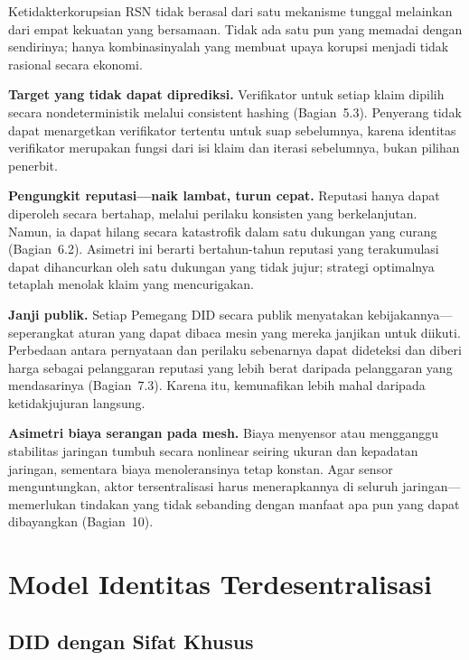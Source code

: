 \documentclass[11pt,a4paper,twocolumn]{article}
\begin{document}
Ketidakterkorupsian RSN tidak berasal dari satu mekanisme tunggal melainkan dari empat kekuatan yang bersamaan. Tidak ada satu pun yang memadai dengan sendirinya; hanya kombinasinyalah yang membuat upaya korupsi menjadi tidak rasional secara ekonomi.

\textbf{Target yang tidak dapat diprediksi.} Verifikator untuk setiap klaim dipilih secara nondeterministik melalui consistent hashing (Bagian~5.3). Penyerang tidak dapat menargetkan verifikator tertentu untuk suap sebelumnya, karena identitas verifikator merupakan fungsi dari isi klaim dan iterasi sebelumnya, bukan pilihan penerbit.

\textbf{Pengungkit reputasi---naik lambat, turun cepat.} Reputasi hanya dapat diperoleh secara bertahap, melalui perilaku konsisten yang berkelanjutan. Namun, ia dapat hilang secara katastrofik dalam satu dukungan yang curang (Bagian~6.2). Asimetri ini berarti bertahun-tahun reputasi yang terakumulasi dapat dihancurkan oleh satu dukungan yang tidak jujur; strategi optimalnya tetaplah menolak klaim yang mencurigakan.

\textbf{Janji publik.} Setiap Pemegang DID secara publik menyatakan kebijakannya---seperangkat aturan yang dapat dibaca mesin yang mereka janjikan untuk diikuti. Perbedaan antara pernyataan dan perilaku sebenarnya dapat dideteksi dan diberi harga sebagai pelanggaran reputasi yang lebih berat daripada pelanggaran yang mendasarinya (Bagian~7.3). Karena itu, kemunafikan lebih mahal daripada ketidakjujuran langsung.

\textbf{Asimetri biaya serangan pada mesh.} Biaya menyensor atau mengganggu stabilitas jaringan tumbuh secara nonlinear seiring ukuran dan kepadatan jaringan, sementara biaya menoleransinya tetap konstan. Agar sensor menguntungkan, aktor tersentralisasi harus menerapkannya di seluruh jaringan---memerlukan tindakan yang tidak sebanding dengan manfaat apa pun yang dapat dibayangkan (Bagian~10).

\section{Model Identitas Terdesentralisasi}

\subsection{DID dengan Sifat Khusus}
\end{document}

